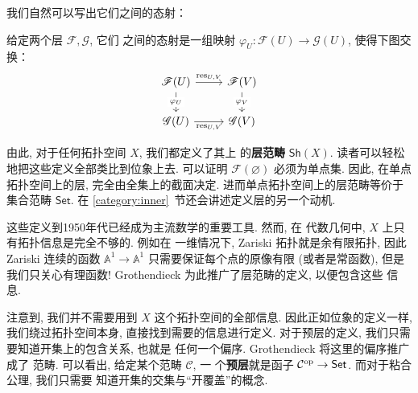 我们自然可以写出它们之间的态射：
\begin{definition}
给定两个层 \(\mathscr F, \mathscr G\), 它们
之间的态射是一组映射 \(\varphi_U : \mathscr F(U) \to \mathscr G(U)\),
使得下图交换：
\[\begin{tikzcd}
{\mathscr F(U)} & {\mathscr F(V)} \\
{\mathscr G(U)} & {\mathscr G(V)}
\arrow["{\mathrm{res}_{U,V}}", from=1-1, to=1-2]
\arrow["{\mathrm{res}_{U,V}}"', from=2-1, to=2-2]
\arrow["{\varphi_U}"{description}, from=1-1, to=2-1]
\arrow["{\varphi_V}"{description}, from=1-2, to=2-2]
\end{tikzcd}\]
\end{definition}
由此, 对于任何拓扑空间 \(X\), 我们都定义了其上
的\textbf{层范畴} \(\mathsf{Sh}(X)\).
读者可以轻松地把这些定义全部类比到位象上去.
可以证明 \(\mathscr F(\varnothing)\) 必须为单点集.
因此, 在单点拓扑空间上的层, 完全由全集上的截面决定.
进而单点拓扑空间上的层范畴等价于集合范畴 \(\mathsf{Set}\).
在 \ref{category:inner}~节还会讲述定义层的另一个动机.

这些定义到1950年代已经成为主流数学的重要工具. 然而, 在
代数几何中, \(X\) 上只有拓扑信息是完全不够的. 例如在
一维情况下, Zariski 拓扑就是余有限拓扑, 因此 Zariski
连续的函数 \(\mathbb A^1 \to \mathbb A^1\)
只需要保证每个点的原像有限 (或者是常函数), 但是我们只关心有理函数!
Grothendieck 为此推广了层范畴的定义, 以便包含这些
信息.

注意到, 我们并不需要用到 \(X\) 这个拓扑空间的全部信息.
因此正如位象的定义一样, 我们绕过拓扑空间本身, 直接找到需要的信息进行定义.
对于预层的定义, 我们只需要知道开集上的包含关系, 也就是
任何一个偏序. Grothendieck 将这里的偏序推广成了
范畴. 可以看出, 给定某个范畴 \(\mathcal C\), 一
个\textbf{预层}就是函子 \(\mathcal C^\mathrm{op}
\to \mathsf{Set}\). 而对于粘合公理, 我们只需要
知道开集的交集与“开覆盖”的概念.

